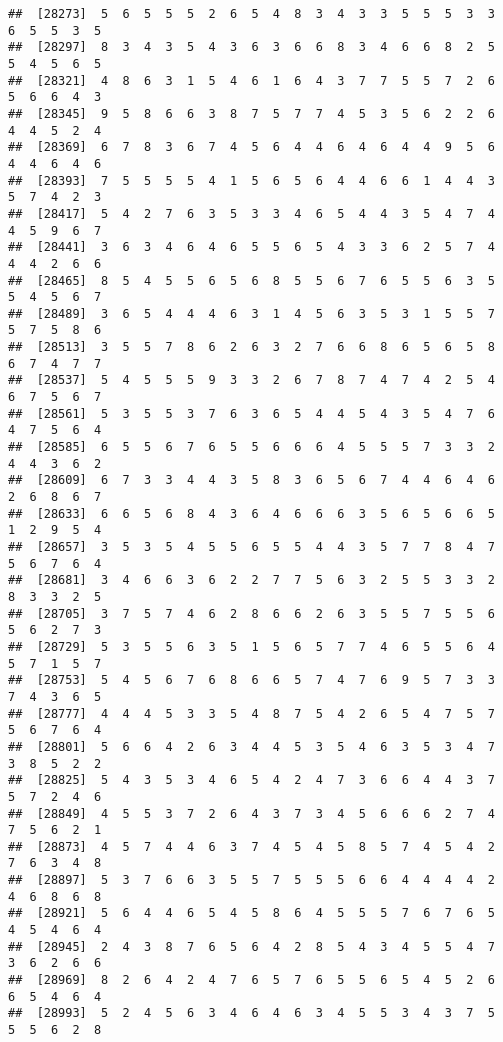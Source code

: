 \documentclass[
]{book}
\begin{document}
\begin{verbatim}
##  [28273]  5  6  5  5  5  2  6  5  4  8  3  4  3  3  5  5  5  3  3  6  5  5  3  5
##  [28297]  8  3  4  3  5  4  3  6  3  6  6  8  3  4  6  6  8  2  5  5  4  5  6  5
##  [28321]  4  8  6  3  1  5  4  6  1  6  4  3  7  7  5  5  7  2  6  5  6  6  4  3
##  [28345]  9  5  8  6  6  3  8  7  5  7  7  4  5  3  5  6  2  2  6  4  4  5  2  4
##  [28369]  6  7  8  3  6  7  4  5  6  4  4  6  4  6  4  4  9  5  6  4  4  6  4  6
##  [28393]  7  5  5  5  5  4  1  5  6  5  6  4  4  6  6  1  4  4  3  5  7  4  2  3
##  [28417]  5  4  2  7  6  3  5  3  3  4  6  5  4  4  3  5  4  7  4  4  5  9  6  7
##  [28441]  3  6  3  4  6  4  6  5  5  6  5  4  3  3  6  2  5  7  4  4  4  2  6  6
##  [28465]  8  5  4  5  5  6  5  6  8  5  5  6  7  6  5  5  6  3  5  5  4  5  6  7
##  [28489]  3  6  5  4  4  4  6  3  1  4  5  6  3  5  3  1  5  5  7  5  7  5  8  6
##  [28513]  3  5  5  7  8  6  2  6  3  2  7  6  6  8  6  5  6  5  8  6  7  4  7  7
##  [28537]  5  4  5  5  5  9  3  3  2  6  7  8  7  4  7  4  2  5  4  6  7  5  6  7
##  [28561]  5  3  5  5  3  7  6  3  6  5  4  4  5  4  3  5  4  7  6  4  7  5  6  4
##  [28585]  6  5  5  6  7  6  5  5  6  6  6  4  5  5  5  7  3  3  2  4  4  3  6  2
##  [28609]  6  7  3  3  4  4  3  5  8  3  6  5  6  7  4  4  6  4  6  2  6  8  6  7
##  [28633]  6  6  5  6  8  4  3  6  4  6  6  6  3  5  6  5  6  6  5  1  2  9  5  4
##  [28657]  3  5  3  5  4  5  5  6  5  5  4  4  3  5  7  7  8  4  7  5  6  7  6  4
##  [28681]  3  4  6  6  3  6  2  2  7  7  5  6  3  2  5  5  3  3  2  8  3  3  2  5
##  [28705]  3  7  5  7  4  6  2  8  6  6  2  6  3  5  5  7  5  5  6  5  6  2  7  3
##  [28729]  5  3  5  5  6  3  5  1  5  6  5  7  7  4  6  5  5  6  4  5  7  1  5  7
##  [28753]  5  4  5  6  7  6  8  6  6  5  7  4  7  6  9  5  7  3  3  7  4  3  6  5
##  [28777]  4  4  4  5  3  3  5  4  8  7  5  4  2  6  5  4  7  5  7  5  6  7  6  4
##  [28801]  5  6  6  4  2  6  3  4  4  5  3  5  4  6  3  5  3  4  7  3  8  5  2  2
##  [28825]  5  4  3  5  3  4  6  5  4  2  4  7  3  6  6  4  4  3  7  5  7  2  4  6
##  [28849]  4  5  5  3  7  2  6  4  3  7  3  4  5  6  6  6  2  7  4  7  5  6  2  1
##  [28873]  4  5  7  4  4  6  3  7  4  5  4  5  8  5  7  4  5  4  2  7  6  3  4  8
##  [28897]  5  3  7  6  6  3  5  5  7  5  5  5  6  6  4  4  4  4  2  4  6  8  6  8
##  [28921]  5  6  4  4  6  5  4  5  8  6  4  5  5  5  7  6  7  6  5  4  5  4  6  4
##  [28945]  2  4  3  8  7  6  5  6  4  2  8  5  4  3  4  5  5  4  7  3  6  2  6  6
##  [28969]  8  2  6  4  2  4  7  6  5  7  6  5  5  6  5  4  5  2  6  6  5  4  6  4
##  [28993]  5  2  4  5  6  3  4  6  4  6  3  4  5  5  3  4  3  7  5  5  5  6  2  8

\end{verbatim}
\end{document}
